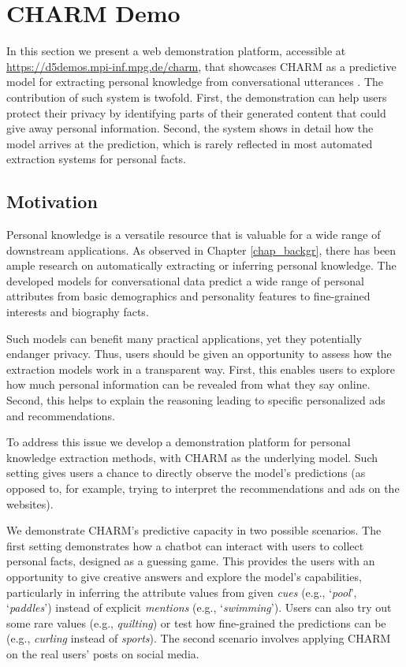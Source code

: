\section{CHARM Demo}

In this section we present a web demonstration platform, accessible at \href{https://d5demos.mpi-inf.mpg.de/charm}{https://d5demos.mpi-inf.mpg.de/charm}, that showcases CHARM as a predictive model for extracting personal knowledge from conversational utterances \cite{tigunova2021exploring}. The contribution of such system is twofold. First, the demonstration can help users protect their privacy by identifying parts of their generated content that could give away personal information. Second, the system shows in detail how the model arrives at the prediction, which is rarely 
reflected in most automated extraction systems for personal facts.

\subsection{Motivation} 

Personal knowledge is a versatile resource that is valuable for a wide range of downstream applications. As observed in Chapter \ref{chap_backgr}, there has been ample research on automatically extracting or inferring personal knowledge. The developed models for conversational data predict a wide range of personal attributes from basic demographics and personality features to fine-grained interests and biography facts.

Such models can benefit many practical applications, yet they potentially endanger privacy. Thus, users should be given an opportunity to assess how the extraction models work in a transparent way. First, this enables users to explore how much personal information can be revealed from what they say online. Second, this helps to explain the reasoning leading to specific personalized ads and recommendations.

To address this issue we develop a demonstration platform for personal knowledge extraction methods, with CHARM as the underlying model. Such setting gives users a chance to directly observe the model's predictions (as opposed to, for example, trying to interpret the recommendations and ads on the websites).

We demonstrate CHARM's predictive capacity in two possible scenarios. The first setting demonstrates how a chatbot can interact with users to collect personal facts, designed as a guessing game. 
This provides the users with an opportunity to give creative answers and explore the model's capabilities, particularly in inferring the attribute values from given \emph{cues} (e.g., `\textit{pool}', `\textit{paddles}') instead of explicit \emph{mentions} (e.g., `\textit{swimming}'). 
Users can also try out some rare values (e.g., \emph{quilting}) or test how fine-grained the predictions can be (e.g., \emph{curling} instead of \emph{sports}). 
The second scenario involves applying CHARM on the real users' posts on social media. 

